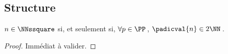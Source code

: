 \subsection{Structure}




\leavevmode
\smallskip

\begin{fact} \label{prime-square}
	$n \in \NNssquare$ si, et seulement si,
	$\forall p \in \PP$\,,
	$\padicval{n} \in 2 \NN$\,.
\end{fact}


\begin{proof}
	Immédiat à valider.
\end{proof}


%
%
%
%


%
%
%
%


%
%
%



